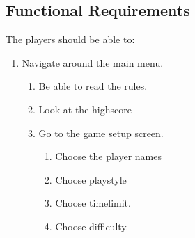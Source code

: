 \documentclass[12pt,a4paper]{scrartcl}
\begin{document}
\subsection{Functional Requirements}
The players should be able to:
\begin{enumerate}

    \item Navigate around the main menu.

    \begin{enumerate}[label=\alph*.]
        \item Be able to read the rules.
        \item Look at the highscore
        \item Go to the game setup screen.
            \begin{enumerate}[label=\roman*.]
                \item Choose the player names
                \item Choose playstyle
                \item Choose timelimit.
                \item Choose difficulty.
            \end{enumerate}
    \end{enumerate}
    

\end{enumerate}
\end{document}
